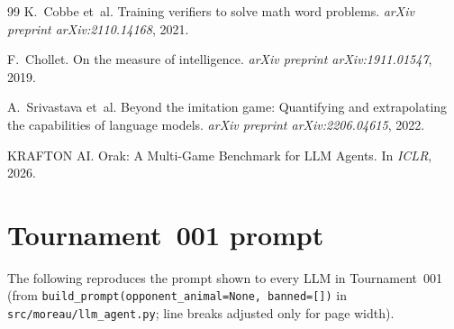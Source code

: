 \documentclass[11pt]{article}
\begin{document}
\begin{thebibliography}{99}
K.~Cobbe et~al.
\newblock Training verifiers to solve math word problems.
\newblock \emph{arXiv preprint arXiv:2110.14168}, 2021.

F.~Chollet.
\newblock On the measure of intelligence.
\newblock \emph{arXiv preprint arXiv:1911.01547}, 2019.

A.~Srivastava et~al.
\newblock Beyond the imitation game: Quantifying and extrapolating the capabilities of language models.
\newblock \emph{arXiv preprint arXiv:2206.04615}, 2022.

KRAFTON AI.
\newblock Orak: A Multi-Game Benchmark for LLM Agents.
\newblock In \emph{ICLR}, 2026.

\end{thebibliography}

\appendix

\section{Tournament~001 prompt}\label{app:t1_prompt}

The following reproduces the prompt shown to every LLM in Tournament~001 (from \texttt{build\_prompt(opponent\_animal=None, banned=[])} in \texttt{src/moreau/llm\_agent.py}; line breaks adjusted only for page width).
\end{document}
